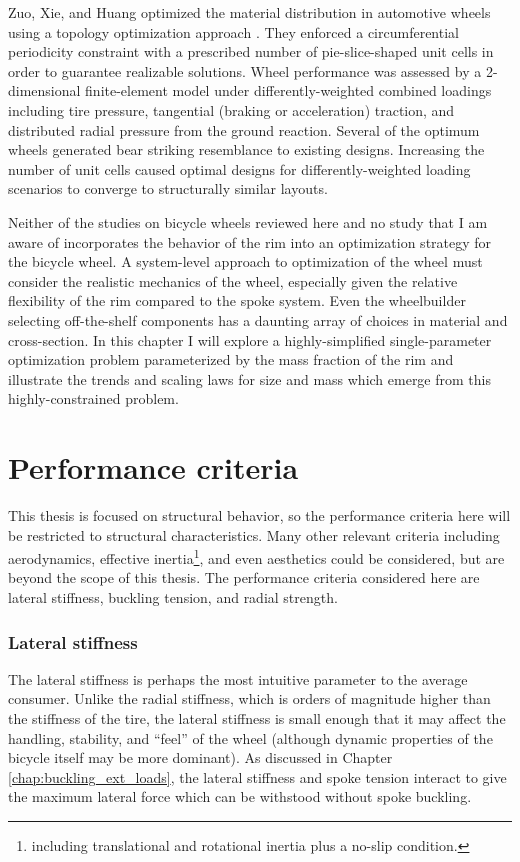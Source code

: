 \documentclass[\rootdir/thesis.tex]{subfiles}
\begin{document}
Zuo, Xie, and Huang optimized the material distribution in automotive wheels using a topology optimization approach \cite{Zuo2011}. They enforced a circumferential periodicity constraint with a prescribed number of pie-slice-shaped unit cells in order to guarantee realizable solutions. Wheel performance was assessed by a 2-dimensional finite-element model under differently-weighted combined loadings including tire pressure, tangential (braking or acceleration) traction, and distributed radial pressure from the ground reaction. Several of the optimum wheels generated bear striking resemblance to existing designs. Increasing the number of unit cells caused optimal designs for differently-weighted loading scenarios to converge to structurally similar layouts.

Neither of the studies on bicycle wheels \cite{Svensson2015,Keller2013} reviewed here and no study that I am aware of incorporates the behavior of the rim into an optimization strategy for the bicycle wheel. A system-level approach to optimization of the wheel must consider the realistic mechanics of the wheel, especially given the relative flexibility of the rim compared to the spoke system. Even the wheelbuilder selecting off-the-shelf components has a daunting array of choices in material and cross-section. In this chapter I will explore a highly-simplified single-parameter optimization problem parameterized by the mass fraction of the rim and illustrate the trends and scaling laws for size and mass which emerge from this highly-constrained problem.


\section{Performance criteria}
\label{sec:performance_criteria}

This thesis is focused on structural behavior, so the performance criteria here will be restricted to structural characteristics. Many other relevant criteria including aerodynamics, effective inertia\footnote{including translational and rotational inertia plus a no-slip condition.}, and even aesthetics could be considered, but are beyond the scope of this thesis. The performance criteria considered here are lateral stiffness, buckling tension, and radial strength.

\subsubsection*{Lateral stiffness}
The lateral stiffness is perhaps the most intuitive parameter to the average consumer. Unlike the radial stiffness, which is orders of magnitude higher than the stiffness of the tire, the lateral stiffness is small enough that it may affect the handling, stability, and ``feel'' of the wheel (although dynamic properties of the bicycle itself may be more dominant). As discussed in Chapter \ref{chap:buckling_ext_loads}, the lateral stiffness and spoke tension interact to give the maximum lateral force which can be withstood without spoke buckling.
\end{document}
